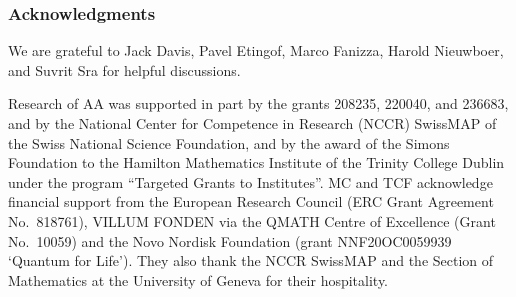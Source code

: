 \documentclass[notitlepage, 11pt, letterpaper]{amsart}
\begin{document}
\subsubsection*{Acknowledgments}
We are grateful to Jack Davis, Pavel Etingof, Marco Fanizza, Harold Nieuwboer, and Suvrit Sra for helpful discussions.

Research of AA was supported in part by the grants 208235, 220040, and 236683, and by the National Center for Competence in Research (NCCR) SwissMAP of the Swiss National Science Foundation, and by the award of the Simons Foundation to the Hamilton Mathematics Institute of the Trinity College Dublin under the program ``Targeted Grants to Institutes''.
MC and TCF acknowledge financial support from the European Research Council (ERC Grant Agreement No.~818761), VILLUM FONDEN via the QMATH Centre of Excellence (Grant No.~10059) and the Novo Nordisk Foundation (grant NNF20OC0059939 `Quantum for Life'). They also thank the NCCR SwissMAP and the Section of Mathematics at the University of Geneva for their hospitality.
\end{document}

